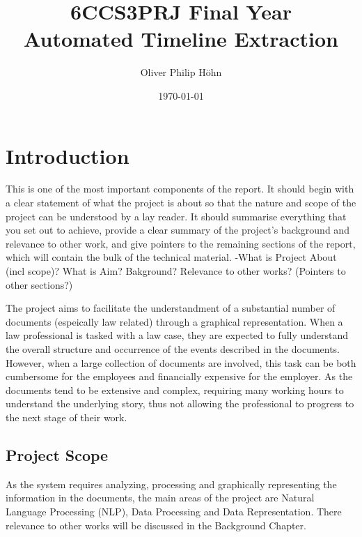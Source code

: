 \documentclass[11pt]{informatics-report}
\title{6CCS3PRJ Final Year\\\vspace{0.2cm}Automated Timeline Extraction}
\author{Oliver Philip H\"ohn}
\date{\today}
\begin{document}
\createFrontMatter
\onehalfspacing
\tableofcontents
\doublespacing


\chapter{Introduction}
This is one of the most important components of the report. It should begin with a clear statement of what the project is about so that the nature and scope of the project can be understood by a lay reader. It should summarise everything that you set out to achieve, provide a clear summary of the project's background and relevance to other work, and give pointers to the remaining sections of the report, which will contain the bulk of the technical material.
-What is Project About (incl scope)? What is Aim? Bakground? Relevance to other works? (Pointers to other sections?)
\par The project aims to facilitate the understandment of a substantial number of documents (espeically law related) through a graphical representation. When a law professional is tasked with a law case, they are expected to fully understand the overall structure and occurrence of the events described in the documents. However, when a large collection of documents are involved, this task can be both cumbersome for the employees and  financially expensive for the employer. As the documents tend to be extensive and complex, requiring many working hours to understand the underlying story, thus not allowing the professional to progress to the next stage of their work.
\section{Project Scope}
\par As the system requires analyzing, processing and graphically representing the information in the documents, the main areas of the project are Natural Language Processing (NLP), Data Processing and Data Representation. There relevance to other works will be discussed in the Background Chapter.
\end{document}

